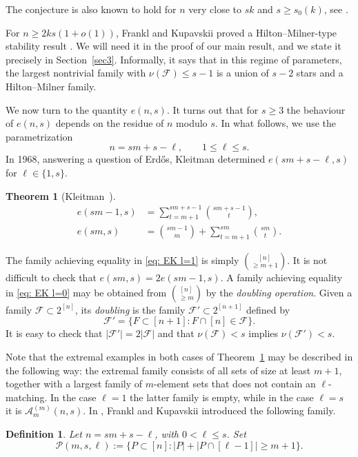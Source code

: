 \documentclass{article}
\newtheorem{theorem}{Theorem}
\newtheorem{definition}{Definition}
\begin{document}
The conjecture is also known to hold for $n$ very close to $sk$ and $s\ge s_0(k)$, see \cite{F7, KoKu}.

For $n \geq 2ks(1+o(1))$, Frankl and Kupavskii proved a Hilton--Milner-type stability result \cite{FK6}. We will need it in the proof of our main result, and we state it precisely in Section~\ref{sec3}. Informally, it says that in this regime of parameters, the largest nontrivial family with $\nu(\mathcal{F})\le s-1$ is a union of $s-2$ stars and a Hilton--Milner family.

We now turn to the quantity $e(n, s)$. It turns out that for $s \geq 3$ the behaviour of $e(n, s)$ depends on the residue of $n$ modulo $s$. In what follows, we use the parametrization
\[
n = sm + s - \ell,
\qquad 1 \le \ell \le s.
\]
In 1968, answering a question of Erd\H{o}s, Kleitman determined $e(sm+s-\ell,s)$ for $\ell \in \{1, s\}$.

\begin{theorem}[Kleitman~\cite{Kl}]  \label{t: Kleitman}
\begin{align}
\label{eq: EK l=1} e(sm-1,s) &= \sum_{t=m+1}^{sm+s-1}{sm+s-1\choose t},\\
\label{eq: EK l=0} e(sm,s) &= {sm-1\choose m}+\sum_{t=m+1}^{sm}{sm\choose t}.
\end{align}
\end{theorem}

The family achieving equality in \eqref{eq: EK l=1} is simply ${[n] \choose \geq m + 1}$. It is not difficult to check that $e(sm, s) = 2e(sm-1, s)$. A family achieving equality in \eqref{eq: EK l=0} may be obtained from ${[n] \choose \geq m}$ by the {\it doubling operation}. Given a family $\mathcal{F} \subset 2^{[n]}$, its {\it doubling} is the family $\mathcal{F}' \subset 2^{[n+1]}$ defined by
\[
\mathcal{F}' = \{F \subset [n + 1]: F \cap [n] \in \mathcal{F}\}.
\]
It is easy to check that $|\mathcal{F}'| = 2|\mathcal{F}|$ and that $\nu(\mathcal{F}) < s$ implies $\nu(\mathcal{F}') < s$.

Note that the extremal examples in both cases of Theorem~\ref{t: Kleitman} may be described in the following way: the extremal family consists of all sets of size at least $m+1$, together with a largest family of $m$-element sets that does not contain an $\ell$-matching. In the case $\ell=1$ the latter family is empty, while in the case $\ell=s$ it is $\mathcal{A}_m^{(m)}(n,s)$. In \cite{FK9}, Frankl and Kupavskii introduced the following family.

\begin{definition}\label{def3}
Let $n = sm+s-\ell$, with $0<\ell\le s$. Set
\[
\mathcal{P}(m,s,\ell) := \bigl\{P\subset [n]: |P|+|P\cap [\ell-1]|\ge m+1\bigr\}.
\]
\end{definition}
\end{document}
